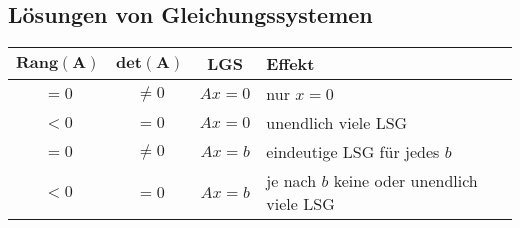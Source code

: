 \subsection{Lösungen von Gleichungssystemen}{
    \vskip1pt
    \begin{center}
    \begin{tabularx}{\linewidth}{| c | c | c | X |}
        \hline
        $\mathbf{Rang(A)}$ & $\mathbf{det(A)}$ & \textbf{LGS} & \textbf{Effekt}\\
        \hline \hline
        $= 0$ & $\neq 0$ & $Ax = 0$ & nur $x = 0$\\
        \hline
        $< 0$ & $= 0$ & $Ax = 0$ & unendlich viele LSG\\
        \hline
        $= 0$ & $\neq 0$ & $Ax = b$ & eindeutige LSG für jedes $b$\\
        \hline
        $< 0$ & $= 0$ & $Ax = b$ & je nach $b$ keine oder unendlich viele LSG\\
        \hline
    \end{tabularx}
    \end{center}
}